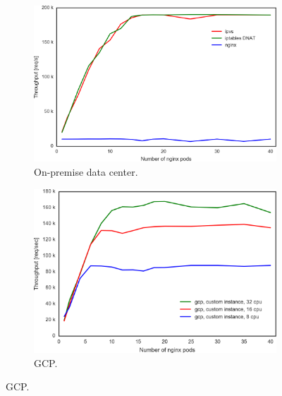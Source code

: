 \begin{figure}[h]

\begin{subfigure}[t]{\columnwidth}
  \includegraphics[width=0.9\columnwidth]{Figs/ipvs-iptables-nginx}
  \caption{On-premise data center.}
  \label{fig:ipvs-iptables-nginx}
\end{subfigure}

  \par\bigskip

  \begin{subfigure}[t]{\columnwidth}
    \includegraphics[width=0.9\columnwidth]{Figs/gcp_all_ieice}
    \caption{GCP.}
    \label{fig:gcp_all_ieice}
  \end{subfigure}

  \par\bigskip


\end{figure}

